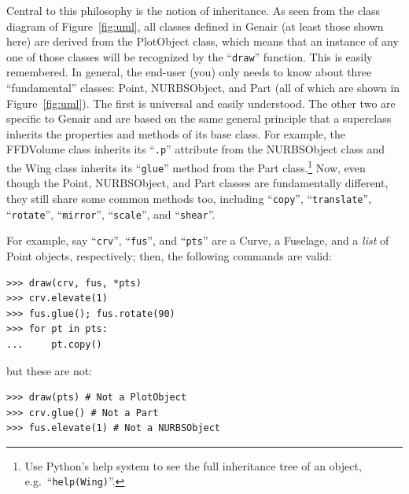 \documentclass[]{article}
\begin{document}
Central to this philosophy is the notion of inheritance.  As seen from 
the class diagram of Figure~\ref{fig:uml}, all classes defined in Genair 
(at least those shown here) are derived from the PlotObject class, which 
means that an instance of any one of those classes will be recognized by 
the ``\texttt{draw}'' function.  This is easily remembered.  In general, 
the end-user (you) only needs to know about three ``fundamental'' 
classes: Point, NURBSObject, and Part (all of which are shown in 
Figure~\ref{fig:uml}).  The first is universal and easily understood.  
The other two are specific to Genair and are based on the same general 
principle that a superclass inherits the properties and methods of its 
base class.  For example, the FFDVolume class inherits its 
``\texttt{.p}'' attribute from the NURBSObject class and the Wing class 
inherits its ``\texttt{glue}'' method from the Part class.\footnote{Use 
Python's help system to see the full inheritance tree of an object, 
e.g.\ ``\texttt{help(Wing)}''.}  Now, even though the Point, 
NURBSObject, and Part classes are fundamentally different, they still 
share some common methods too, including ``\texttt{copy}'', 
``\texttt{translate}'', ``\texttt{rotate}'', ``\texttt{mirror}'', 
``\texttt{scale}'', and ``\texttt{shear}''.

For example, say ``\texttt{crv}'', ``\texttt{fus}'', and 
``\texttt{pts}'' are a Curve, a Fuselage, and a \emph{list} of Point 
objects, respectively; then, the following commands are valid:
\begin{verbatim}
>>> draw(crv, fus, *pts)
>>> crv.elevate(1)
>>> fus.glue(); fus.rotate(90)
>>> for pt in pts:
...     pt.copy()
\end{verbatim}
but these are not:
\begin{verbatim}
>>> draw(pts) # Not a PlotObject
>>> crv.glue() # Not a Part
>>> fus.elevate(1) # Not a NURBSObject
\end{verbatim}
\end{document}
